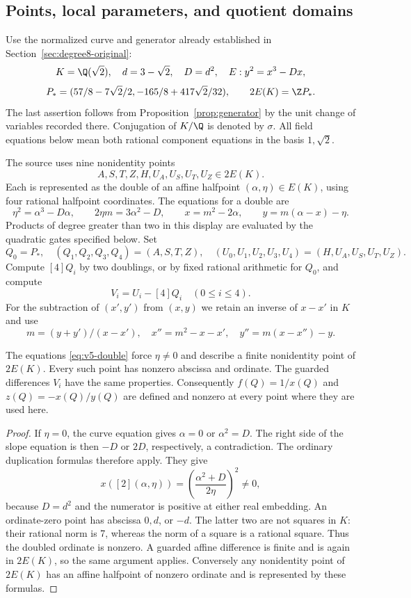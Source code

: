 \subsection{Points, local parameters, and quotient domains}
\label{subsec:v5-point-source}

Use the normalized curve and generator already established in
Section~\ref{sec:degree8-original}:
\[
 K=\Q(\sqrt2),\quad d=3-\sqrt2,\quad D=d^2,
 \quad E:y^2=x^3-Dx,
\]
\[
 P_*=(57/8-7\sqrt2/2,-165/8+417\sqrt2/32),
 \qquad 2E(K)=\Z P_*.
\]
The last assertion follows from Proposition~\ref{prop:generator} by the
unit change of variables recorded there. Conjugation of $K/\Q$ is
denoted by $\sigma$. All field equations below mean both rational
component equations in the basis $1,\sqrt2$.

The source uses nine nonidentity points
\[
 A,S,T,Z,H,U_A,U_S,U_T,U_Z\in2E(K).
\]
Each is represented as the double of an affine halfpoint
$(\alpha,\eta)\in E(K)$, using four rational halfpoint coordinates.
The equations for a double are
\begin{equation}\label{eq:v5-double}
 \eta^2=\alpha^3-D\alpha,\qquad
 2\eta m=3\alpha^2-D,\qquad
 x=m^2-2\alpha,\qquad y=m(\alpha-x)-\eta.
\end{equation}
Products of degree greater than two in this display are evaluated by
the quadratic gates specified below. Set
\[
 Q_0=P_*,\quad(Q_1,Q_2,Q_3,Q_4)=(A,S,T,Z),
 \quad(U_0,U_1,U_2,U_3,U_4)=(H,U_A,U_S,U_T,U_Z).
\]
Compute $[4]Q_i$ by two doublings, or by fixed rational arithmetic for
$Q_0$, and compute
\[
 V_i=U_i-[4]Q_i\quad(0\le i\le4).
\]
For the subtraction of $(x',y')$ from $(x,y)$ we retain an inverse of
$x-x'$ in $K$ and use
\[
 m=(y+y')/(x-x'),\quad x''=m^2-x-x',\quad
 y''=m(x-x'')-y.
\]

\begin{lemma}\label{lem:v5-point-domains}
The equations \eqref{eq:v5-double} force $\eta\ne0$ and describe a
finite nonidentity point of $2E(K)$. Every such point has nonzero
abscissa and ordinate. The guarded differences $V_i$ have the same
properties. Consequently $f(Q)=1/x(Q)$ and $z(Q)=-x(Q)/y(Q)$ are
defined and nonzero at every point where they are used here.
\end{lemma}
\begin{proof}
If $\eta=0$, the curve equation gives $\alpha=0$ or $\alpha^2=D$.
The right side of the slope equation is then $-D$ or $2D$, respectively,
a contradiction. The ordinary duplication formulas therefore apply.
They give
\[
 x([2](\alpha,\eta))=
 \left(\frac{\alpha^2+D}{2\eta}\right)^2\ne0,
\]
because $D=d^2$ and the numerator is positive at either real embedding.
An ordinate-zero point has abscissa $0,d$, or $-d$.
The latter two are not squares in $K$: their rational norm is 7,
whereas the norm of a square is a rational square. Thus the doubled
ordinate is nonzero. A guarded affine difference is finite and is
again in $2E(K)$, so the same argument applies. Conversely any
nonidentity point of $2E(K)$ has an affine halfpoint of nonzero
ordinate and is represented by these formulas.
\end{proof}

